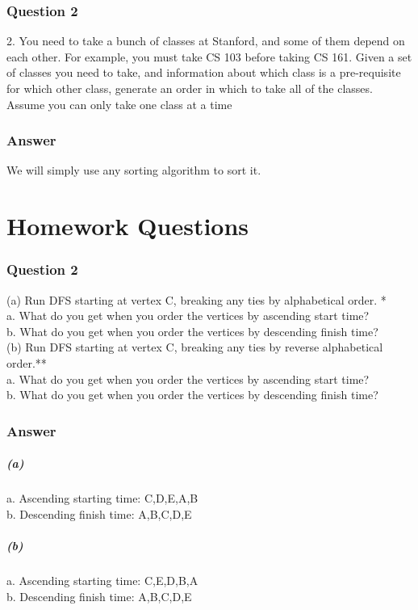\documentclass[10pt]{article}
\begin{document}
\section*{Question 2}

2. You need to take a bunch of classes at Stanford, and some of them depend on each other.
For example, you must take CS 103 before taking CS 161. Given a set of classes you need
to take, and information about which class is a pre-requisite for which other class, generate
an order in which to take all of the classes. Assume you can only take one class at a time


\section*{Answer}
We will simply use any sorting algorithm to sort it. 
\part*{Homework Questions}

\section*{Question 2}
(a) Run DFS starting at vertex C, breaking any ties by alphabetical order. *\\
a. What do you get when you order the vertices by ascending start time?\\
b. What do you get when you order the vertices by descending finish time?\\
(b) Run DFS starting at vertex C, breaking any ties by reverse alphabetical order.**\\
a. What do you get when you order the vertices by ascending start time?\\
b. What do you get when you order the vertices by descending finish time? 

\section*{Answer }

\subsubsection*{(a)}

a. Ascending starting time: C,D,E,A,B\\
b. Descending finish time: A,B,C,D,E\\
	

\subsubsection*{(b)}
a. Ascending starting time: C,E,D,B,A\\
b. Descending finish time: A,B,C,D,E\\
\end{document}

